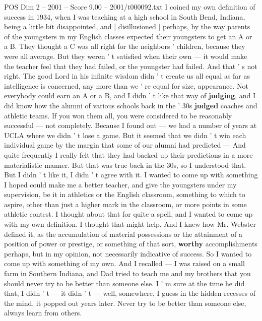 \begin{textsample}{POS Dim 2 – 2001 – Score 9.00 – 2001/t000092.txt}  \label{ex:f2_pos_040}
I coined my own definition of success in 1934, when I was teaching at a high school in South Bend, Indiana, being a little bit disappointed, and [ disillusioned ] perhaps, by the way parents of the youngsters in my English classes expected their youngsters to get an A or a B.
They thought a C was all right for the neighbors ' children, because they were all average.
But they weren ' t satisfied when their own — it would make the teacher feel that they had failed, or the youngster had failed.
And that ' s not right.
The good Lord in his infinite wisdom didn ' t create us all equal as far as intelligence is concerned, any more than we ' re equal for size, appearance.
Not everybody could earn an A or a B, and I didn ' t like that way of \textbf{judging}, and I did know how the alumni of various schools back in the ' 30s \textbf{judged} coaches and athletic teams.
If you won them all, you were considered to be reasonably successful — not completely.
Because I found out — we had a number of years at UCLA where we didn ' t lose a game.
But it seemed that we didn ' t win each individual game by the margin that some of our alumni had predicted — And quite frequently I really felt that they had backed up their predictions in a more materialistic manner.
But that was true back in the 30s, so I understood that.
But I didn ' t like it, I didn ' t agree with it.
I wanted to come up with something I hoped could make me a better teacher, and give the youngsters under my supervision, be it in athletics or the English classroom, something to which to aspire, other than just a higher mark in the classroom, or more points in some athletic contest.
I thought about that for quite a spell, and I wanted to come up with my own definition.
I thought that might help.
And I knew how Mr.
Webster defined it, as the accumulation of material possessions or the attainment of a position of power or prestige, or something of that sort, \textbf{worthy} accomplishments perhaps, but in my opinion, not necessarily indicative of success.
So I wanted to come up with something of my own.
And I recalled — I was raised on a small farm in Southern Indiana, and Dad tried to teach me and my brothers that you should never try to be better than someone else.
I ' m sure at the time he did that, I didn ' t — it didn ' t — well, somewhere, I guess in the hidden recesses of the mind, it popped out years later.
Never try to be better than someone else, always learn from others.

\end{textsample}
